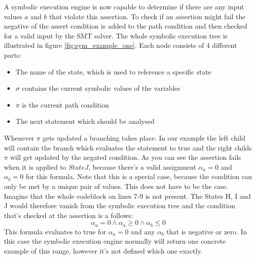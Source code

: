 A symbolic execution engine is now capable to determine if there are any input values $a$  and $b$ that violate this assertion. To check if an assertion might fail the negative of the assert condition is added to the path condition and then checked for a valid input by the SMT solver. The whole symbolic execution tree is illustrated in figure \ref{fig:sym_example_one}. Each node consists of 4 different parts:
\begin{itemize}
\item The name of the state, which is used to reference a specific state
\item $\sigma$ contains the current symbolic values of the variables
\item $\pi$ is the current path condition
\item The next statement which should be analysed
\end{itemize}
Whenever $\pi$ gets updated a branching takes place. In our example the left child will contain the branch which evaluates the statement to true and the right childs $\pi$ will get updated by the negated condition.
As you can see the assertion fails when it is applied to $State J$, because there's a valid assignment $\alpha_a = 0$ and $\alpha_b = 0$ for this formula. Note that this is a special case, because the condition can only be met by a unique pair of values. This does not have to be the case. Imagine that the whole codeblock on lines 7-9 is not present. The States H, I and J would therefore vanish from the symbolic execution tree and the condition that's checked at the assertion is a follows:
$$\alpha_a  = 0 \land \alpha_a \geq 0 \land \alpha_b \leq 0$$
This formula evaluates to true for $\alpha_a = 0$  and any $\alpha_b$ that is negative or zero. In this case the symbolic execution engine normally will return one concrete example of this range, however it's not defined which one exactly. 
